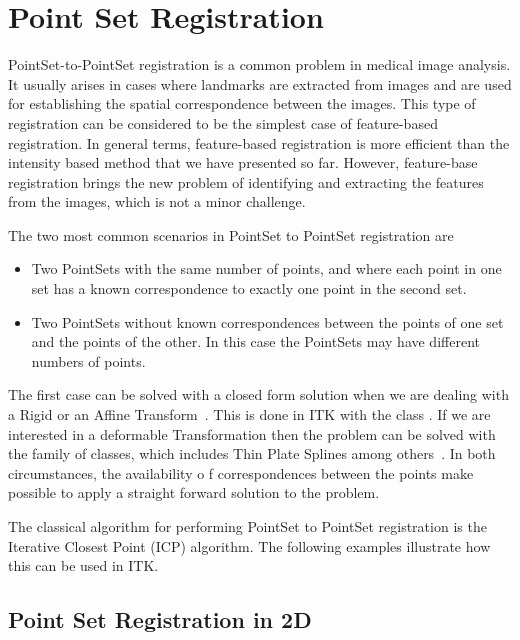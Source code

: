 \section{Point Set Registration}
\label{sec:PointSetRegistration}

PointSet-to-PointSet registration is a common problem in medical image
analysis. It usually arises in cases where landmarks are extracted from images
and are used for establishing the spatial correspondence between the images.
This type of registration can be considered to be the simplest case of
feature-based registration. In general terms, feature-based registration is
more efficient than the intensity based method that we have presented so far.
However, feature-base registration brings the new problem of identifying and
extracting the features from the images, which is not a minor challenge.

The two most common scenarios in PointSet to PointSet registration are

\begin{itemize}
\item Two PointSets with the same number of points, and where each point in one
set has a known correspondence to exactly one point in the second set.
\item Two PointSets without known correspondences between the points of one set
and the points of the other. In this case the PointSets may have different
numbers of points.
\end{itemize}

The first case can be solved with a closed form solution when we are dealing
with a Rigid or an Affine Transform~\cite{Horn1987}. This is done in ITK with
the class . If we are interested in
a deformable Transformation then the problem can be solved with the
 family of classes, which includes Thin Plate Splines
among others~\cite{Rohr2001}. In both circumstances, the availability o f
correspondences between the points make possible to apply a straight forward
solution to the problem.


The classical algorithm for performing PointSet to PointSet registration is the
Iterative Closest Point (ICP) algorithm.  The following examples illustrate how
this can be used in ITK.



\subsection{Point Set Registration in 2D}
\label{sec:PointSetRegistrationIn2D}

